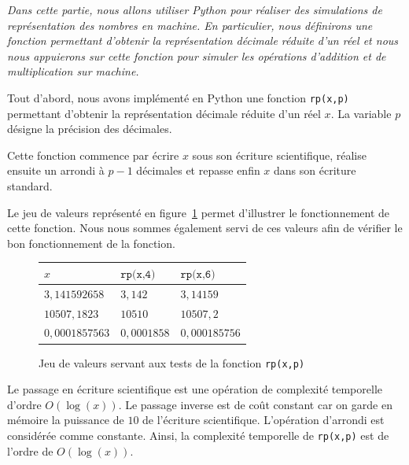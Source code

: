 \documentclass{article}
\begin{document}
\textit{Dans cette partie, nous allons utiliser Python pour réaliser des simulations de représentation des nombres en machine. En particulier, nous définirons une fonction permettant d'obtenir la représentation décimale réduite d'un réel et nous nous appuierons sur cette fonction pour simuler les opérations d'addition et de multiplication sur machine.}
\vskip 1mm ~



 
Tout d'abord, nous avons implémenté en Python une fonction \verb|rp(x,p)| permettant d'obtenir la représentation décimale réduite d'un réel $x$. La variable $p$ désigne la précision des décimales.

Cette fonction commence par écrire $x$ sous son écriture scientifique, réalise ensuite un arrondi à $p-1$ décimales et repasse enfin $x$ dans son écriture standard.

Le jeu de valeurs représenté en figure~\ref{fig:tests_rp} permet d'illustrer le fonctionnement de cette fonction. Nous nous sommes également servi de ces valeurs afin de vérifier le bon fonctionnement de la fonction.

\begin{figure}[h]
  \centering
  \begin{tabular}{|l|l|l|}
    \hline
    $x$ & $\texttt{rp(x,4)}$ & $\texttt{rp(x,6)}$ \\
    \hline
    $3,141592658$ & $3,142$ & $3,14159$ \\
    \hline
    $10507,1823$ & $10510$ & $10507,2$ \\
    \hline
    $0,0001857563$ & $0,0001858$ & $0,000185756$ \\
    \hline
  \end{tabular}
   \caption{Jeu de valeurs servant aux tests de la fonction \texttt{rp(x,p)}}
   \label{fig:tests_rp}
\end{figure}

Le passage en écriture scientifique est une opération de complexité temporelle d'ordre $O(\log(x))$. Le passage inverse est de coût constant car on garde en mémoire la puissance de $10$ de l'écriture scientifique. L'opération d'arrondi est considérée comme constante. Ainsi, la complexité temporelle de \verb|rp(x,p)| est de l'ordre de $O(\log(x))$.
\vskip 1mm ~

\end{document}
